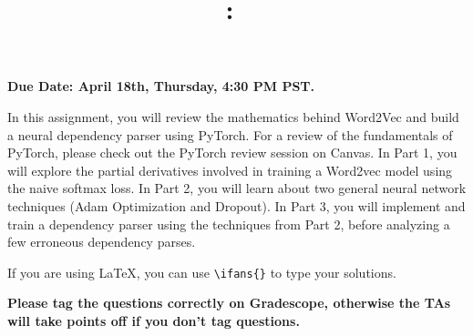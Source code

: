 \documentclass[answers]{exam}
\title{
\vspace{-1in}
\textmd{\textbf{\hmwkClass:\ \hmwkTitle}}
}
\author{}
\date{}
\newif\ifanswers
\newcommand{\ifans}[1]{\ifanswers \color{red} \textbf{Solution: } #1 \color{black} \fi}
\begin{document}
\maketitle
\vspace{-3em}

\textbf{Due Date: April 18th, Thursday, 4:30 PM PST.}

In this assignment, you will review the mathematics behind Word2Vec and build a neural dependency parser using PyTorch. For a review of the fundamentals of PyTorch, please check out the PyTorch review session on Canvas. In Part 1, you will explore the partial derivatives involved in training a Word2vec model using the naive softmax loss. In Part 2, you will learn about two general neural network techniques (Adam Optimization and Dropout). In Part 3, you will implement and train a dependency parser using the techniques from Part 2, before analyzing a few erroneous dependency parses. 

If you are using LaTeX, you can use \verb!\ifans{}! to type your solutions.

\textbf{Please tag the questions correctly on Gradescope, otherwise the TAs will take points off if you don't tag questions.}
\begin{questions}
    
    \newpage
    
    \newpage
    
\end{questions}


\end{document}
